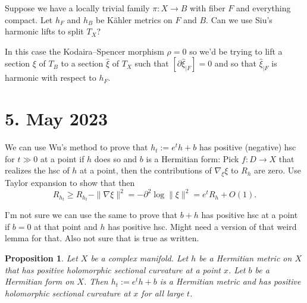 \documentclass[11pt]{amsart}
\newtheorem{prop}[theo]{Proposition}
\theoremstyle{definition}
\begin{document}
Suppose we have a locally trivial family $\pi : X \to B$ with fiber $F$ and
everything compact.
Let $h_F$ and $h_B$ be K\"ahler metrics on $F$ and $B$.
Can we use Siu's harmonic lifts to split $T_X$?

In this case the Kodaira--Spencer morphism $\rho = 0$
so we'd be trying to lift a section $\xi$ of $T_B$ to a section $\hat \xi$ of
$T_X$ such that $[\partial \hat\xi_{|F}] = 0$
and so that $\hat \xi_{|F}$ is harmonic with respect to $h_F$.

\section{5. May 2023}

We can use Wu's method to prove that $h_t := e^t h + b$ has positive (negative)
hsc for $t \gg 0$ at a point if $h$ does so and $b$ is a Hermitian form:
Pick $f : D \to X$ that realizes the hsc of $h$ at a point, then the
contributions of $\nabla_\xi \xi$ to $R_{h}$ are zero.
Use Taylor expansion to show that then
$$
R_{h_t}
\geq R_{h_t} - \| \nabla \xi \|^2
= - \partial^2 \log \|\xi\|^2
= e^t R_h + O(1).
$$

I'm not sure we can use the same to prove that $b + h$ has positive hsc at a
point if $b = 0$ at that point and $h$ has positive hsc.
Might need a version of that weird lemma for that.
Also not sure that is true as written.


\begin{prop}
Let $X$ be a complex manifold.
Let $h$ be a Hermitian metric on $X$ that has positive holomorphic sectional curvature at a point $x$.
Let $b$ be a Hermitian form on $X$.
Then $h_t := e^t h + b$ is a Hermitian metric and has positive holomorphic
sectional curvature at $x$ for all large $t$.
\end{prop}
\end{document}
